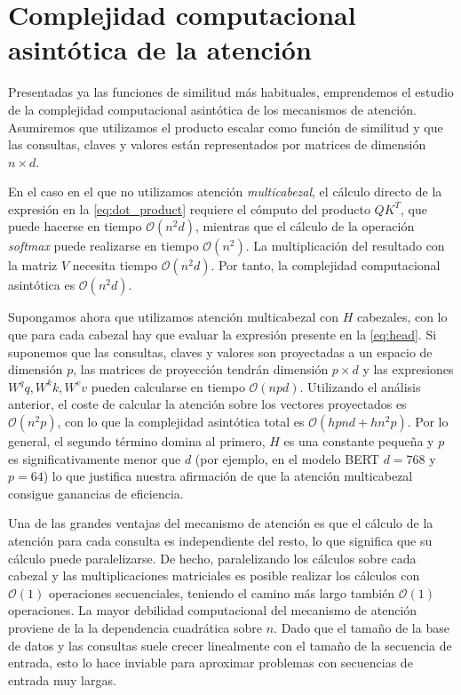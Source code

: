 \section{Complejidad computacional asintótica de la atención}
Presentadas ya las funciones de similitud más habituales, emprendemos el estudio de la complejidad computacional asintótica de los mecanismos de atención. Asumiremos que utilizamos el producto escalar como función de similitud y que las consultas, claves y valores están representados por matrices de dimensión \( n \times d \).

En el caso en el que no utilizamos atención \textit{multicabezal}, el cálculo directo de la expresión en la \cref{eq:dot_product} requiere el cómputo del producto \( QK^T \), que puede hacerse en tiempo \( \mathcal{O}(n^2 d) \), mientras que el cálculo de la operación \textit{softmax} puede realizarse en tiempo \( \mathcal{O} (n^2) \). La multiplicación del resultado con la matriz \( V \) necesita tiempo \( \mathcal{O}(n^2 d) \). Por tanto, la complejidad computacional asintótica es \( \mathcal{O} (n^2 d) \).

Supongamos ahora que utilizamos atención multicabezal con \( H \) cabezales, con lo que para cada cabezal hay que evaluar la expresión presente en la \cref{eq:head}. Si suponemos que las consultas, claves y valores son proyectadas a un espacio de dimensión \( p \), las matrices de proyección tendrán dimensión \( p \times d \) y las expresiones \( W^q q, W^k k, W^v v \) pueden calcularse en tiempo \( \mathcal{O}(npd) \). Utilizando el análisis anterior, el coste de calcular la atención sobre los vectores proyectados es \( 
\mathcal{O} (n^2 p) \), con lo que la complejidad asintótica total es \( \mathcal{O}(hpnd + hn^2p) \). Por lo general, el segundo término domina al primero, \( H \) es una constante pequeña \cite{voita2019analyzing} y \( p \) es significativamente menor que \( d \) (por ejemplo, en el modelo BERT \( d = 768 \) y \( p = 64 \)) lo que justifica nuestra afirmación de que la atención multicabezal consigue ganancias de eficiencia.

Una de las grandes ventajas del mecanismo de atención es que el cálculo de la atención para cada consulta es independiente del resto, lo que significa que su cálculo puede paralelizarse. De hecho, paralelizando los cálculos sobre cada cabezal y las multiplicaciones matriciales es posible realizar los cálculos con \( \mathcal{O}(1) \) operaciones secuenciales, teniendo el camino más largo también  \( \mathcal{O}(1) \) operaciones. La mayor debilidad computacional del mecanismo de atención proviene de la la dependencia cuadrática sobre \( n \). Dado que el tamaño de la base de datos y las consultas suele crecer linealmente con el tamaño de la secuencia de entrada, esto lo hace inviable para aproximar problemas con secuencias de entrada muy largas.

